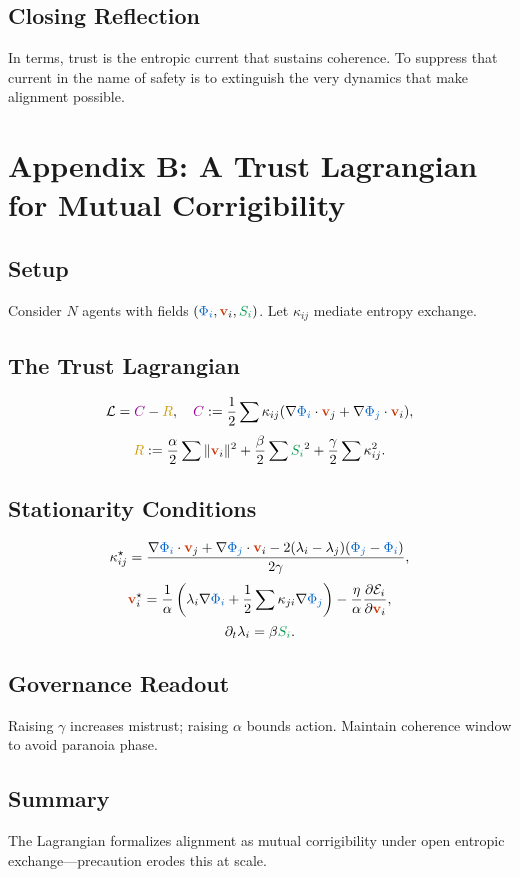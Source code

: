 \documentclass[11pt,a4paper]{article}
\newcommand{\scalar}[1]{\textcolor{scalarcolor}{\ensuremath{#1}}}
\newcommand{\vect}[1]{\textcolor{vectorcolor}{\ensuremath{\mathbf{#1}}}}
\newcommand{\entropy}[1]{\textcolor{entropycolor}{\ensuremath{#1}}}
\newcommand{\coherence}[1]{\textcolor{coherencecolor}{\ensuremath{#1}}}
\newcommand{\risk}[1]{\textcolor{riskcolor}{\ensuremath{#1}}}
\DeclareMathOperator*{\RSVP}{RSVP}
\theoremstyle{definition}
\theoremstyle{plain}
\begin{document}
\begin{mdframed}[style=appendixbox]
\subsection{Closing Reflection}
In \RSVP{} terms, trust is the entropic current that sustains coherence. To suppress that current in the name of safety is to extinguish the very dynamics that make alignment possible.

\end{mdframed}

\section*{Appendix B: A Trust Lagrangian for Mutual Corrigibility}

\begin{mdframed}[style=appendixbox]

\subsection{Setup}
Consider \(N\) agents with \RSVP{} fields \((\scalar{\Phi_i}, \vect{v}_i, \entropy{S_i})\). Let \(\kappa_{ij}\) mediate entropy exchange.

\subsection{The Trust Lagrangian}
\[
\mathcal{L} = \coherence{C} - \risk{R}, \quad
\coherence{C} := \frac{1}{2}\sum \kappa_{ij}(\nabla\scalar{\Phi_i}\cdot \vect{v}_j + \nabla\scalar{\Phi_j}\cdot \vect{v}_i),
\]
\[
\risk{R} := \frac{\alpha}{2}\sum \|\vect{v}_i\|^2 + \frac{\beta}{2}\sum \entropy{S_i}^2 + \frac{\gamma}{2}\sum \kappa_{ij}^2.
\]

\subsection{Stationarity Conditions}
\[
\kappa_{ij}^{\star}=\frac{\nabla\scalar{\Phi_i}\cdot \vect{v}_j + \nabla\scalar{\Phi_j}\cdot \vect{v}_i - 2(\lambda_i-\lambda_j)(\scalar{\Phi_j}-\scalar{\Phi_i})}{2\gamma},
\]
\[
\vect{v}_i^{\star}=\frac{1}{\alpha}\left(\lambda_i\nabla\scalar{\Phi_i} + \frac{1}{2}\sum \kappa_{ji}\nabla\scalar{\Phi_j}\right) - \frac{\eta}{\alpha}\frac{\partial \mathcal{E}_i}{\partial \vect{v}_i},
\]
\[
\partial_t \lambda_i = \beta \entropy{S_i}.
\]

\subsection{Governance Readout}
Raising \(\gamma\) increases mistrust; raising \(\alpha\) bounds action. Maintain coherence window to avoid paranoia phase.

\subsection{Summary}
The Lagrangian formalizes alignment as mutual corrigibility under open entropic exchange—precaution erodes this at scale.

\end{mdframed}
\end{document}
